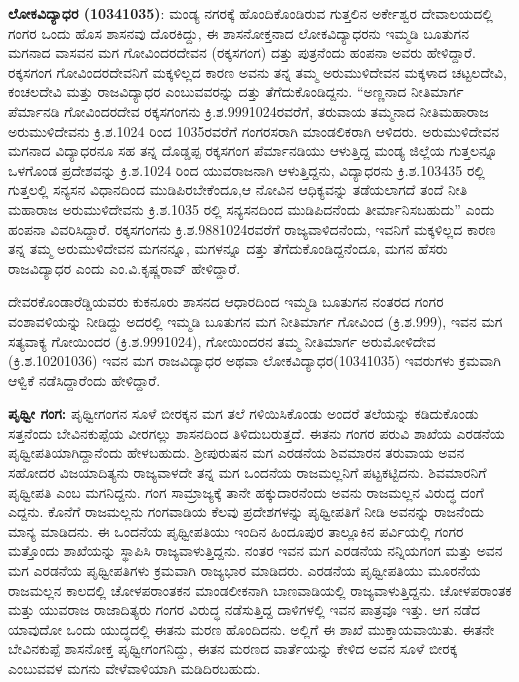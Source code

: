 \textbf{ಲೋಕವಿದ್ಯಾಧರ (1034\general{\enginline{-}}1035)}: ಮಂಡ್ಯ ನಗರಕ್ಕೆ ಹೊಂದಿಕೊಂಡಿರುವ ಗುತ್ತಲಿನ ಅರ್ಕೇಶ್ವರ ದೇವಾಲಯದಲ್ಲಿ ಗಂಗರ ಒಂದು ಹೊಸ ಶಾಸನವು ದೊರಕಿದ್ದು, ಈ ಶಾಸನೋಕ್ತನಾದ ಲೋಕವಿದ್ಯಾಧರನು ಇಮ್ಮಡಿ ಬೂತುಗನ ಮಗನಾದ ವಾಸವನ ಮಗ ಗೋವಿಂದರದೇವನ (ರಕ್ಕಸಗಂಗ) ದತ್ತು ಪುತ್ರನೆಂದು ಹಂಪನಾ ಅವರು ಹೇಳಿದ್ದಾರೆ. ರಕ್ಕಸಗಂಗ ಗೋವಿಂದರದೇವನಿಗೆ ಮಕ್ಕಳಿಲ್ಲದ ಕಾರಣ ಅವನು ತನ್ನ ತಮ್ಮ ಅರುಮುಳಿದೇವನ ಮಕ್ಕಳಾದ ಚಟ್ಟಲದೇವಿ, ಕಂಚಲದೇವಿ ಮತ್ತು ರಾಜವಿದ್ಯಾಧರ ಎಂಬುವವರನ್ನು ದತ್ತು ತೆಗೆದುಕೊಂಡಿದ್ದನು. “ಅಣ್ಣನಾದ ನೀತಿಮಾರ್ಗ ಪೆರ್ಮಾನಡಿ ಗೋವಿಂದರದೇವ ರಕ್ಕಸಗಂಗನು ಕ್ರಿ.ಶ.999\enginline{-}1024ರವರೆಗೆ, ತರುವಾಯ ತಮ್ಮನಾದ ನೀತಿಮಹಾರಾಜ ಅರುಮುಳಿದೇವನು ಕ್ರಿ.ಶ.1024 ರಿಂದ 1035ರವರೆಗೆ ಗಂಗರಸರಾಗಿ ಮಾಂಡಲಿಕರಾಗಿ ಆಳಿದರು. ಅರುಮುಳಿದೇವನ ಮಗನಾದ ವಿದ್ಯಾಧರನೂ ಸಹ ತನ್ನ ದೊಡ್ಡಪ್ಪ ರಕ್ಕಸಗಂಗ ಪೆರ್ಮಾನಡಿಯು ಆಳುತ್ತಿದ್ದ ಮಂಡ್ಯ ಜಿಲ್ಲೆಯ ಗುತ್ತಲನ್ನೂ ಒಳಗೊಂಡ ಪ್ರದೇಶವನ್ನು ಕ್ರಿ.ಶ.1024 ರಿಂದ ಯುವರಾಜನಾಗಿ ಆಳುತ್ತಿದ್ದನು, ವಿದ್ಯಾಧರನು ಕ್ರಿ.ಶ.1034\enginline{-}35 ರಲ್ಲಿ ಗುತ್ತಲಲ್ಲಿ ಸನ್ಯಸನ ವಿಧಾನದಿಂದ ಮುಡಿಪಿರಬೇಕೆಂದೂ,ಆ ನೋವಿನ ಆಧಿಕ್ಯವನ್ನು ತಡೆಯಲಾಗದೆ ತಂದೆ ನೀತಿ ಮಹಾರಾಜ ಅರುಮುಳಿದೇವನು ಕ್ರಿ.ಶ.1035 ರಲ್ಲಿ ಸನ್ಯಸನದಿಂದ ಮುಡಿಪಿದನೆಂದು ತೀರ್ಮಾನಿಸಬಹುದು” ಎಂದು ಹಂಪನಾ ವಿವರಿಸಿದ್ದಾರೆ. ರಕ್ಕಸಗಂಗನು ಕ್ರಿ.ಶ.988\enginline{-}1024ರವರೆಗೆ ರಾಜ್ಯವಾಳಿದನೆಂದು, ಇವನಿಗೆ ಮಕ್ಕಳಿಲ್ಲದ ಕಾರಣ ತನ್ನ ತಮ್ಮ ಅರುಮುಳಿದೇವನ ಮಗನನ್ನೂ, ಮಗಳನ್ನೂ ದತ್ತು ತೆಗೆದುಕೊಂಡಿದ್ದನೆಂದೂ, ಮಗನ ಹೆಸರು ರಾಜವಿದ್ಯಾಧರ ಎಂದು ಎಂ.ವಿ.ಕೃಷ್ಣರಾವ್​ ಹೇಳಿದ್ದಾರೆ.

ದೇವರಕೊಂಡಾರೆಡ್ಡಿಯವರು ಕುಕನೂರು ಶಾಸನದ ಆಧಾರದಿಂದ ಇಮ್ಮಡಿ ಬೂತುಗನ ನಂತರದ ಗಂಗರ ವಂಶಾವಳಿ\-ಯನ್ನು ನೀಡಿದ್ದು ಅದರಲ್ಲಿ ಇಮ್ಮಡಿ ಬೂತುಗನ ಮಗ ನೀತಿಮಾರ್ಗ ಗೋವಿಂದ (ಕ್ರಿ.ಶ.999), ಇವನ ಮಗ ಸತ್ಯವಾಕ್ಯ ಗೋಯಿಂದರ (ಕ್ರಿ.ಶ.999\enginline{-}1024), ಗೋಯಿಂದರನ ತಮ್ಮ ನೀತಿಮಾರ್ಗ ಅರುಮೋಳಿದೇವ (ಕ್ರಿ.ಶ.1020\enginline{-}1036) ಇವನ ಮಗ ರಾಜವಿದ್ಯಾಧರ ಅಥವಾ ಲೋಕವಿದ್ಯಾಧರ(1034\enginline{-}1035) ಇವರುಗಳು ಕ್ರಮವಾಗಿ ಆಳ್ವಿಕೆ ನಡೆಸಿದ್ದಾರೆಂದು ಹೇಳಿದ್ದಾರೆ.

\textbf{ಪೃಥ್ವೀ ಗಂಗ:} ಪೃಥ್ವೀಗಂಗನ ಸೂಳೆ ಬೀರಕ್ಕನ ಮಗ ತಲೆ ಗಳಿಯಿಸಿಕೊಂಡು ಅಂದರೆ ತಲೆಯನ್ನು ಕಡಿದುಕೊಂಡು ಸತ್ತನೆಂದು ಬೇವಿನಕುಪ್ಪೆಯ ವೀರಗಲ್ಲು ಶಾಸನದಿಂದ ತಿಳಿದುಬರುತ್ತದೆ. ಈತನು ಗಂಗರ ಪರುವಿ ಶಾಖೆಯ ಎರಡನೆಯ ಪೃಥ್ವೀಪತಿಯಾಗಿದ್ದಾನೆಂದು ಹೇಳಬಹುದು. ಶ‍್ರೀಪುರುಷನ ಮಗ ಎರಡನೆಯ ಶಿವಮಾರನ ತರುವಾಯ ಅವನ ಸಹೋದರ ವಿಜಯಾದಿತ್ಯನು ರಾಜ್ಯವಾಳದೇ ತನ್ನ ಮಗ ಒಂದನೆಯ ರಾಜಮಲ್ಲನಿಗೆ ಪಟ್ಟಕಟ್ಟಿದನು. ಶಿವಮಾರನಿಗೆ ಪೃಥ್ವೀಪತಿ ಎಂಬ ಮಗನಿದ್ದನು. ಗಂಗ ಸಾಮ್ರಾಜ್ಯಕ್ಕೆ ತಾನೇ ಹಕ್ಕುದಾರನೆಂದು ಅವನು ರಾಜಮಲ್ಲನ ವಿರುದ್ಧ ದಂಗೆ ಎದ್ದನು. ಕೊನೆಗೆ ರಾಜಮಲ್ಲನು ಗಂಗವಾಡಿಯ ಕೆಲವು ಪ್ರದೇಶಗಳನ್ನು ಪೃಥ್ವೀಪತಿಗೆ ನೀಡಿ ಅವನನ್ನು ರಾಜನೆಂದು ಮಾನ್ಯ ಮಾಡಿದನು. ಈ ಒಂದನೆಯ ಪೃಥ್ವೀಪತಿಯು ಇಂದಿನ ಹಿಂದೂಪುರ ತಾಲ್ಲೂಕಿನ ಪರ್ವಿಯಲ್ಲಿ ಗಂಗರ ಮತ್ತೊಂದು ಶಾಖೆಯನ್ನು ಸ್ಥಾಪಿಸಿ ರಾಜ್ಯವಾಳುತ್ತಿದ್ದನು. ನಂತರ ಇವನ ಮಗ ಎರಡನೆಯ ನನ್ನಿಯಗಂಗ ಮತ್ತು ಅವನ ಮಗ ಎರಡನೆಯ ಪೃಥ್ವೀಪತಿಗಳು ಕ್ರಮವಾಗಿ ರಾಜ್ಯಭಾರ ಮಾಡಿದರು. ಎರಡನೆಯ ಪೃಥ್ವೀಪತಿಯು ಮೂರನೆಯ ರಾಜಮಲ್ಲನ ಕಾಲದಲ್ಲಿ ಚೋಳಪರಾಂತಕನ ಮಾಂಡಲೀಕನಾಗಿ ಬಾಣವಾಡಿಯಲ್ಲಿ ರಾಜ್ಯವಾಳುತ್ತಿದ್ದನು. ಚೋಳಪರಾಂತಕ ಮತ್ತು ಯುವರಾಜ ರಾಜಾದಿತ್ಯರು ಗಂಗರ ವಿರುದ್ಧ ನಡೆಸುತ್ತಿದ್ದ ದಾಳಿಗಳಲ್ಲಿ ಇವನ ಪಾತ್ರವೂ ಇತ್ತು. ಆಗ ನಡೆದ ಯಾವುದೋ ಒಂದು ಯುದ್ಧದಲ್ಲಿ ಈತನು ಮರಣ ಹೊಂದಿದನು. ಅಲ್ಲಿಗೆ ಈ ಶಾಖೆ ಮುಕ್ತಾಯವಾಯಿತು. ಈತನೇ ಬೇವಿನಕುಪ್ಪೆ ಶಾಸನೋಕ್ತ ಪೃಥ್ವೀಗಂಗನಿದ್ದು, ಈತನ ಮರಣದ ವಾರ್ತೆಯನ್ನು ಕೇಳಿದ ಅವನ ಸೂಳೆ ಬೀರಕ್ಕ ಎಂಬುವವಳ ಮಗನು ವೇಳೆವಾಳಿಯಾಗಿ ಮಡಿದಿರಬಹುದು.


